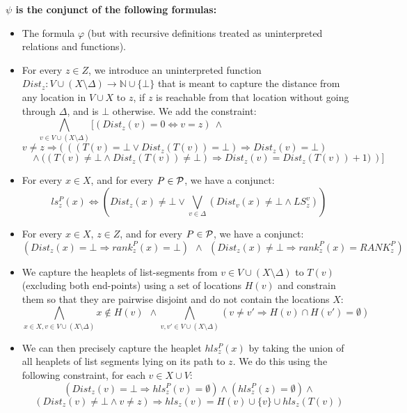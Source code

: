 \medskip
\noindent 
{\bf $\psi$ is the conjunct of the following formulas:}
\begin{itemize}
	\item The formula $\varphi$ (but with recursive definitions treated as uninterpreted relations and functions).
	\item For every $z \in Z$, we introduce an uninterpreted function $Dist_z: V \cup (X \setminus \Delta) \longrightarrow \mathbb{N} \cup \{\bot\}$ that
             is meant to capture the distance from any location in $V \cup X$ to $z$, if $z$ is reachable from
               that location without going through $\Delta$, and is $\bot$ otherwise. We add the constraint:
          $$\bigwedge_{v \in V\cup (X\setminus \Delta)} \big[ (Dist_z(v)\!=\!0 \Leftrightarrow v=z) ~\wedge ~~~~~~~~~~~~~~~~~~~~~~~~~~~~~~~~~~~~~~~~~~~~~~~~~~~~~~$$
          $$ v \!\not =\! z \Rightarrow \big(~\left( (T(v)\!=\!\bot \vee Dist_z(T(v))\!=\!\bot) \Rightarrow Dist_z(v) \!=\! \bot
                 \right)~~~~~~~~~~~~~~~$$
          $$  ~~~~~  \left. \wedge ~((T(v) \not = \bot \wedge Dist_z(T(v)) \not = \bot) \Rightarrow Dist_z(v) = Dist_z(T(v))+1
                \big) ~\right)\big] $$
              
	\item For every $x \in X$, and for every $P \in {\cal P}$, we have a conjunct:
		     $$ls_z^P(x) \Leftrightarrow (Dist_z(x)\not= \bot \vee \bigvee_{v \in \Delta} (Dist_v(x) \not = \bot
		       \wedge LS_z^v))$$
		     
    \item For every $x \in X$, $z \in Z$, and for every $P \in {\cal P}$, we have a conjunct:
             $$ \left( Dist_z(x) \!=\! \bot \Rightarrow rank_z^P\!(x)\!=\!\bot\right) ~~\wedge~~ 
               \left( Dist_z(x) \!\not =\! \bot \Rightarrow rank_z^P\!(x)\!=\!RANK_z^P \right)$$
               
    \item We capture the heaplets of list-segments from $v \in V \cup (X \setminus \Delta)$ to $T(v)$ (excluding both
              end-points) using a set
             of locations $H(v)$
             and constrain them so that they are pairwise disjoint and do not contain the locations $X$:
             $$ \bigwedge_{x \in X, v \in V \cup (X \setminus \Delta)} x \not \in H(v) ~~\wedge 
             \bigwedge_{v,v' \in V \cup (X \setminus \Delta)} (v \!\not =\! v' \Rightarrow H(v) \cap H(v') = \emptyset)$$  
    
    \item We can then precisely capture the heaplet $hls_z^P(x)$ by taking the union of all heaplets of
           list segments lying on its path to $z$. We do this using the following constraint, for each
           $v \in X \cup V$:
           $$(Dist_z(v)=\bot \Rightarrow hls_z^P (v) = \emptyset) \wedge (hls_z^P(z)= \emptyset)\wedge $$
           $$(Dist_z(v) \not = \bot \wedge v \not = z) \Rightarrow hls_z(v)= H(v) \cup \{v\} \cup hls_z(T(v))$$

\end{itemize}

